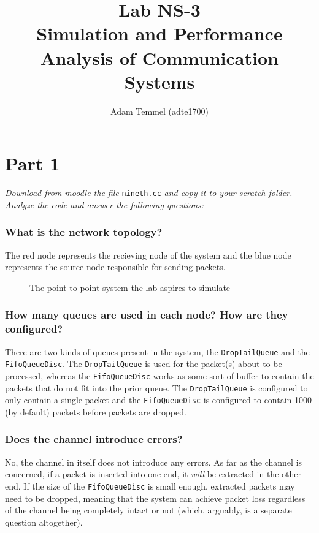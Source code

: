 \documentclass[a4paper, titlepage,12pt]{article}
\title{Lab NS-3\\Simulation and Performance Analysis of Communication Systems}
\author{Adam Temmel (adte1700)}
\begin{document}
	\maketitle
	\section*{Part 1}\label{sec:introduction}
		\textit{Download from moodle the file} \verb|nineth.cc| \textit{and copy it to your scratch folder. Analyze the code and answer the following questions:}

		\subsubsection*{What is the network topology?}

			The red node represents the recieving node of the system and the blue node represents the source node responsible for sending packets.

			\begin{figure}[h!]
				\centering
				\caption{The point to point system the lab aspires to simulate}
			\end{figure}

		\subsubsection*{How many queues are used in each node? How are they configured?}

			There are two kinds of queues present in the system, the \verb|DropTailQueue| and the \verb|FifoQueueDisc|. The \verb|DropTailQueue| is used for the packet(s) about to be processed, whereas the \verb|FifoQueueDisc| works as some sort of buffer to contain the packets that do not fit into the prior queue. The \verb|DropTailQueue| is configured to only contain a single packet and the \verb|FifoQueueDisc| is configured to contain 1000 (by default) packets before packets are dropped.

		\subsubsection*{Does the channel introduce errors?}

			No, the channel in itself does not introduce any errors. As far as the channel is concerned, if a packet is inserted into one end, it \emph{will} be extracted in the other end. If the size of the \verb|FifoQueueDisc| is small enough, extracted packets may need to be dropped, meaning that the system can achieve packet loss regardless of the channel being completely intact or not (which, arguably, is a separate question altogether).
\end{document}
